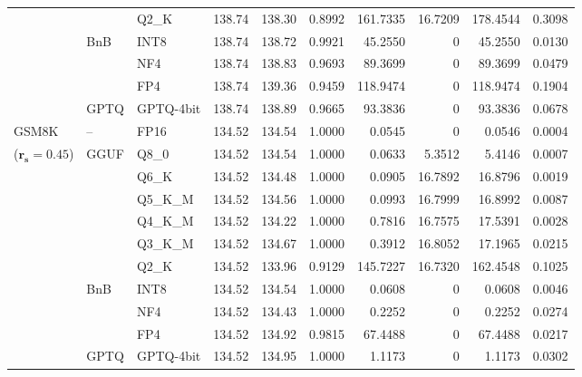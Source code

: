 \begin{longtable}{ll l rrrrrrr}
 &  & Q2\_K & 138.74 & 138.30 & \cellcolor{red!18} 0.8992 & \cellcolor{red!18} 161.7335 & 16.7209 & \cellcolor{red!18} 178.4544 & \cellcolor{red!18} 0.3098 \\
 & BnB & INT8 & 138.74 & 138.72 & 0.9921 & 45.2550 & \cellcolor{cyan!12} $0$ & 45.2550 & 0.0130 \\
 &  & NF4 & 138.74 & 138.83 & 0.9693 & 89.3699 & \cellcolor{cyan!12} $0$ & 89.3699 & 0.0479 \\
 &  & FP4 & 138.74 & 139.36 & \cellcolor{red!18} 0.9459 & \cellcolor{red!18} 118.9474 & \cellcolor{cyan!12} $0$ & \cellcolor{red!18} 118.9474 & \cellcolor{red!18} 0.1904 \\
 & GPTQ & GPTQ-4bit & 138.74 & 138.89 & 0.9665 & 93.3836 & \cellcolor{cyan!12} $0$ & 93.3836 & 0.0678 \\
\midrule
GSM8K & -- & FP16 & 134.52 & 134.54 & 1.0000 & 0.0545 & \cellcolor{cyan!12} $0$ & 0.0546 & 0.0004 \\
{\small ($\mathbf{r_s{=}0.45}$)} & GGUF & Q8\_0 & 134.52 & 134.54 & 1.0000 & 0.0633 & 5.3512 & 5.4146 & 0.0007 \\
 &  & Q6\_K & 134.52 & 134.48 & 1.0000 & 0.0905 & 16.7892 & 16.8796 & 0.0019 \\
 &  & Q5\_K\_M & 134.52 & 134.56 & 1.0000 & 0.0993 & 16.7999 & 16.8992 & 0.0087 \\
 &  & Q4\_K\_M & 134.52 & 134.22 & 1.0000 & 0.7816 & 16.7575 & 17.5391 & 0.0028 \\
 &  & Q3\_K\_M & 134.52 & 134.67 & 1.0000 & 0.3912 & 16.8052 & 17.1965 & 0.0215 \\
 &  & Q2\_K & 134.52 & 133.96 & \cellcolor{red!18} 0.9129 & \cellcolor{red!18} 145.7227 & 16.7320 & \cellcolor{red!18} 162.4548 & \cellcolor{red!18} 0.1025 \\
 & BnB & INT8 & 134.52 & 134.54 & 1.0000 & 0.0608 & \cellcolor{cyan!12} $0$ & 0.0608 & 0.0046 \\
 &  & NF4 & 134.52 & 134.43 & 1.0000 & 0.2252 & \cellcolor{cyan!12} $0$ & 0.2252 & 0.0274 \\
 &  & FP4 & 134.52 & 134.92 & 0.9815 & 67.4488 & \cellcolor{cyan!12} $0$ & 67.4488 & 0.0217 \\
 & GPTQ & GPTQ-4bit & 134.52 & 134.95 & 1.0000 & 1.1173 & \cellcolor{cyan!12} $0$ & 1.1173 & 0.0302 \\
\end{longtable}
\endgroup